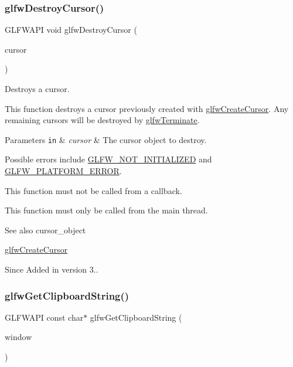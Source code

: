 \subsubsection{\texorpdfstring{glfw\+Destroy\+Cursor()}{glfwDestroyCursor()}}
{\footnotesize\ttfamily G\+L\+F\+W\+A\+PI void glfw\+Destroy\+Cursor (\begin{DoxyParamCaption}\item[{\hyperlink{glfw3_8h_a89261ae18c75e863aaf2656ecdd238f4}{G\+L\+F\+Wcursor} $\ast$}]{cursor }\end{DoxyParamCaption})}



Destroys a cursor. 

This function destroys a cursor previously created with \hyperlink{group__input_gac0f0f691f2d110f9acfb4bfe07f1216c}{glfw\+Create\+Cursor}. Any remaining cursors will be destroyed by \hyperlink{group__init_gafd90e6fd4819ea9e22e5e739519a6504}{glfw\+Terminate}.


\begin{DoxyParams}[1]{Parameters}
\mbox{\tt in}  & {\em cursor} & The cursor object to destroy.\\
\hline
\end{DoxyParams}
Possible errors include \hyperlink{group__errors_ga2374ee02c177f12e1fa76ff3ed15e14a}{G\+L\+F\+W\+\_\+\+N\+O\+T\+\_\+\+I\+N\+I\+T\+I\+A\+L\+I\+Z\+ED} and \hyperlink{group__errors_gad44162d78100ea5e87cdd38426b8c7a1}{G\+L\+F\+W\+\_\+\+P\+L\+A\+T\+F\+O\+R\+M\+\_\+\+E\+R\+R\+OR}.

This function must not be called from a callback.

This function must only be called from the main thread.

\begin{DoxySeeAlso}{See also}
cursor\+\_\+object 

\hyperlink{group__input_gac0f0f691f2d110f9acfb4bfe07f1216c}{glfw\+Create\+Cursor}
\end{DoxySeeAlso}
\begin{DoxySince}{Since}
Added in version 3.. 
\end{DoxySince}
\mbox{\label{group__input_ga3ac90c8bbaf0b46063bb02b574f3b6f7}} 
\subsubsection{\texorpdfstring{glfw\+Get\+Clipboard\+String()}{glfwGetClipboardString()}}
{\footnotesize\ttfamily G\+L\+F\+W\+A\+PI const char$\ast$ glfw\+Get\+Clipboard\+String (\begin{DoxyParamCaption}\item[{\hyperlink{group__window_ga3c96d80d363e67d13a41b5d1821f3242}{G\+L\+F\+Wwindow} $\ast$}]{window }\end{DoxyParamCaption})}




